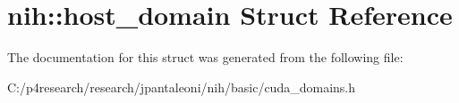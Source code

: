 \hypertarget{structnih_1_1host__domain}{
\section{nih\-:\-:host\-\_\-domain \-Struct \-Reference}
\label{structnih_1_1host__domain}
}


\-The documentation for this struct was generated from the following file\-:\begin{DoxyCompactItemize}
\item 
\-C\-:/p4research/research/jpantaleoni/nih/basic/cuda\-\_\-domains.\-h\end{DoxyCompactItemize}
